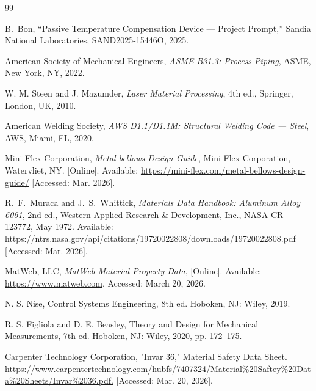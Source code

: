 \documentclass[12pt, letterpaper]{report}%
\begin{document}

%

\begin{thebibliography}{99}

    B.\ Bon,
    ``Passive Temperature Compensation Device --- Project Prompt,''
    Sandia National Laboratories, SAND2025-15446O, 2025.

    American Society of Mechanical Engineers, \textit{ASME B31.3: Process Piping}, 
    ASME, New York, NY, 2022.

    W. M. Steen and J. Mazumder, \textit{Laser Material Processing}, 4th ed., 
    Springer, London, UK, 2010.

    American Welding Society, \textit{AWS D1.1/D1.1M: Structural Welding Code --- Steel}, 
    AWS, Miami, FL, 2020.

    Mini-Flex Corporation, \textit{Metal bellows Design Guide}, Mini-Flex Corporation, 
    Watervliet, NY. [Online]. Available: \url{https://mini-flex.com/metal-bellows-design-guide/}
    [Accessed: Mar. 2026].

    R.\ F.\ Muraca and J.\ S.\ Whittick,
    \textit{Materials Data Handbook: Aluminum Alloy 6061}, 2nd ed.,
    Western Applied Research \& Development, Inc.,
    NASA CR-123772, May 1972.
    Available: \url{https://ntrs.nasa.gov/api/citations/19720022808/downloads/19720022808.pdf}
    [Accessed: Mar. 2026].

    MatWeb, LLC, \textit{MatWeb Material Property Data}, 
    [Online]. Available: \url{https://www.matweb.com}, 
    Accessed: March 20, 2026.

    N. S. Nise, Control Systems Engineering, 8th ed. Hoboken, NJ: Wiley, 2019.

    R. S. Figliola and D. E. Beasley, Theory and Design for Mechanical Measurements, 7th ed. Hoboken, NJ: Wiley, 2020, pp. 172–175.

    Carpenter Technology Corporation, "Invar 36," Material Safety Data Sheet. \url{https://www.carpentertechnology.com/hubfs/7407324/Material%20Saftey%20Data%20Sheets/Invar%2036.pdf.}
    [Accessed: Mar. 20, 2026].
   

\end{thebibliography}
\end{document}
